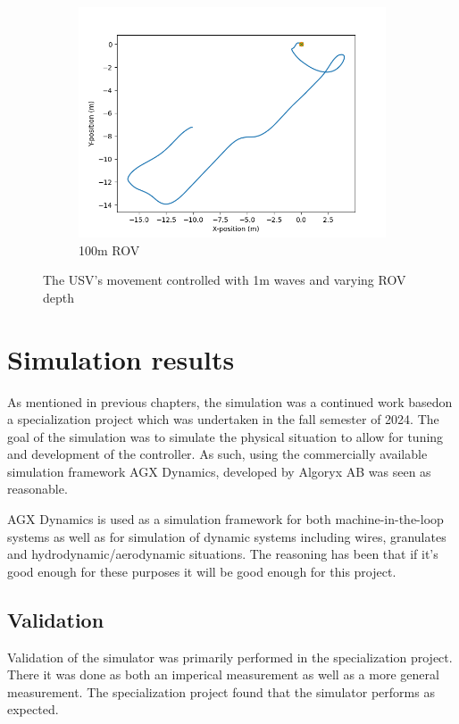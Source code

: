 \documentclass[class=article, crop=false]{standalone}
\begin{document}
\begin{figure}
\begin{subfigure}{0.7\textwidth}
        \includegraphics{scenario1/rov-100m/1.0m/usv_position_controlled}
        \caption{100m ROV}
    \end{subfigure}
    \caption{The USV's movement controlled with 1m waves and varying ROV depth}
    \label{fig:1.0m-controlled}
\end{figure}

\section{Simulation results}
As mentioned in previous chapters, the simulation was a continued work basedon a specialization project which was undertaken in the fall semester of 2024. The goal of the simulation was to simulate the physical situation to allow for tuning and development of the controller. As such, using the commercially available simulation framework AGX Dynamics, developed by Algoryx AB was seen as reasonable.

AGX Dynamics is used as a simulation framework for both machine-in-the-loop systems as well as for simulation of dynamic systems including wires, granulates and hydrodynamic/aerodynamic situations. The reasoning has been that if it's good enough for these purposes it will be good enough for this project.

\subsection{Validation}
Validation of the simulator was primarily performed in the specialization project. There it was done as both an imperical measurement as well as a more general measurement. The specialization project found that the simulator performs as expected.
\end{document}
